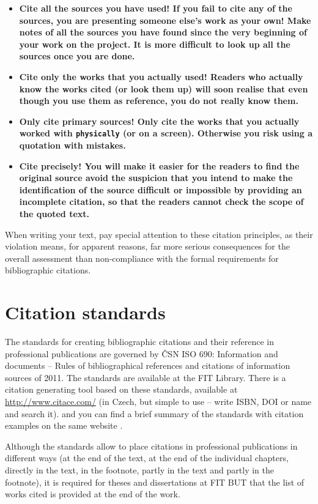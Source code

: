 \begin{itemize}
  \item{\bf Cite all the sources you have used! \rm If you fail to cite any of the sources, you are presenting someone else's work as your own! Make notes of all the sources you have found since the very beginning of your work on the project. It is more difficult to look up all the sources once you are done.}
  \item{\bf Cite only the works that you actually used! \rm Readers who actually know the works cited (or look them up) will soon realise that even though you use them as reference, you do not really know them.}
  \item{\bf Only cite primary sources! \rm Only cite the works that you actually worked with \texttt{physically} (or on a screen). Otherwise you risk using a quotation with mistakes.}
  \item{\bf Cite precisely! \rm You will make it easier for the readers to find the original source avoid the suspicion that you intend to make the identification of the source difficult or impossible by providing an incomplete citation, so that the readers cannot check the scope of the quoted text.} 
\end{itemize}

When writing your text, pay special attention to these citation principles, as their violation means, for apparent reasons, far  more serious consequences for the overall assessment than non-compliance with the formal requirements for bibliographic citations.

\section{Citation standards}

The standards for creating bibliographic citations and their reference in professional publications are governed by ČSN ISO 690:  Information and documents -- Rules of bibliographical references and citations of 
information sources of 2011. The standards are available at the FIT Library. There is a citation generating tool based on these standards, available at \url{http://www.citace.com/} (in Czech, but simple to use -- write ISBN, DOI or name and search it). and you can find a brief summary of the standards with citation examples 
on the same website \cite{biblio}.

Although the standards allow to place citations in professional publications in different ways (at the end of the text, at the end of the individual chapters, directly in the text, in the footnote, partly in the text and partly in the footnote), it is required for theses and dissertations at FIT BUT that the list of works cited is provided at the end of the work.

